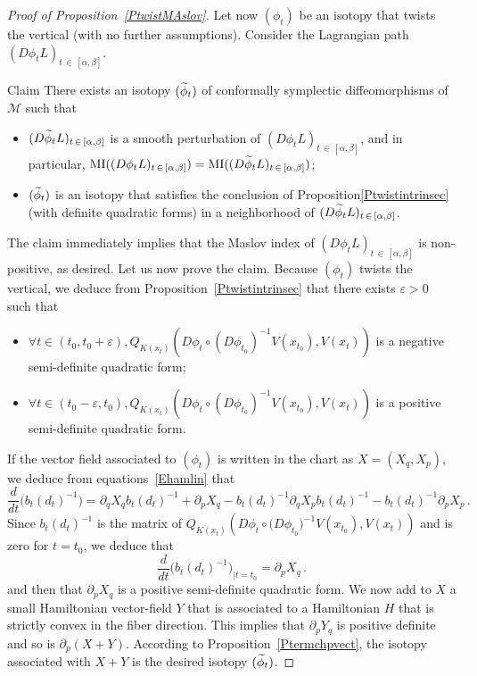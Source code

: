 \documentclass[AHL, Unicode, longabstracts, published]{cedram}
\newcommand*\M{\mathcal{M}}
\newcommand{\MI}{\mathrm{MI}}
\let\oldtilde\tilde
\renewcommand*{\tilde}[1]{\mathchoice{\widetilde{#1}}{\widetilde{#1}}{\oldtilde{#1}}{\oldtilde{#1}}}
\let\oldforall\forall
\renewcommand*{\forall}{\mathrel{\oldforall}}
\begin{document}
\begin{proof}[Proof of Proposition~\ref{PtwistMAslov}]
Let now $(\phi_t)$ be an isotopy that twists the vertical (with no further assumptions). Consider the Lagrangian path $(D\phi_tL)_{t\,\in\,[\alpha,\beta]}$.

\begin{enonce}{Claim}
There exists an isotopy $(\tilde\phi_t)$ of conformally symplectic diffeomorphisms of $\M$ such that
\begin{itemize}
\item $(D\tilde\phi_tL)_{t\,\in\,[\alpha,\beta]}$ is a smooth perturbation of $(D\phi_tL)_{t\,\in\,[\alpha,\beta]}$, and in particular, $\MI((D\phi_tL)_{t\,\in\,[\alpha,\beta]})=\MI((D\tilde\phi_tL)_{t\,\in\,[\alpha,\beta]})$;
\item $(\tilde\phi_t)$ is an isotopy {that satisfies the conclusion of Proposition\ref{Ptwistintrinsec} (with definite quadratic forms) in a neighborhood of $(D\tilde\phi_tL)_{t\,\in\,[\alpha,\beta]}$.}
\end{itemize}
\end{enonce}

The claim immediately implies that the Maslov index of $(D\phi_tL)_{t\,\in\,[\alpha,\beta]}$ is non-positive, as desired.\newline
Let us now prove the claim. Because $(\phi_t)$ twists the vertical, we deduce from Proposition~\ref{Ptwistintrinsec} that there exists $\varepsilon>0$ such that
\begin{itemize}
\item $\forall t\in (t_0, t_0+\varepsilon), Q_{K(x_t)}(D\phi_t\circ (D\phi_{t_0})^{-1}V(x_{t_0}), V(x_t)) $ is a negative semi-definite quadratic form;
\item $\forall t\in (t_0-\varepsilon, t_0), Q_{K(x_t)}(D\phi_t\circ (D\phi_{t_0})^{-1}V(x_{t_0}), V(x_t)) $ is a positive semi-definite quadratic form.
\end{itemize}
If the vector field associated to $(\phi_t)$ is written in the chart as $X=(X_q, X_p)$, we deduce from equations~\eqref{Ehamlin} that
\[
\frac{d}{dt}\big(b_t(d_t)^{-1}
\big)=\partial_qX_qb_t(d_t)^{-1}+\partial_pX_q-b_t(d_t)^{-1}\partial_qX_pb_t(d_t)^{-1}-b_t(d_t)^{-1}\partial_pX_p\,.
\]
Since $b_t(d_t)^{-1}$ is the matrix of $Q_{K(x_t)}(D\phi_t\circ \big(D\phi_{t_0}\big)^{-1}V(x_{t_0}), V(x_t))$ and is zero for $t=t_0$, we deduce that
\[
\frac{d}{dt}\big(b_t(d_t)^{-1}
\big)_{|t=t_0}= \partial_pX_q\,.
\]
and then that $\partial_pX_q$ is a positive semi-definite quadratic form. We now add to $X$ a small Hamiltonian vector-field $Y$ that is associated to a Hamiltonian $H$ that is strictly convex in the fiber direction. This implies that $\partial_pY_q$ is positive definite and so is $\partial_p(X+Y)$. {According to Proposition~\ref{Ptermchpvect},} the isotopy associated with $X+Y$ is the desired isotopy $(\tilde\phi_t)$.
\end{proof}
\end{document}
